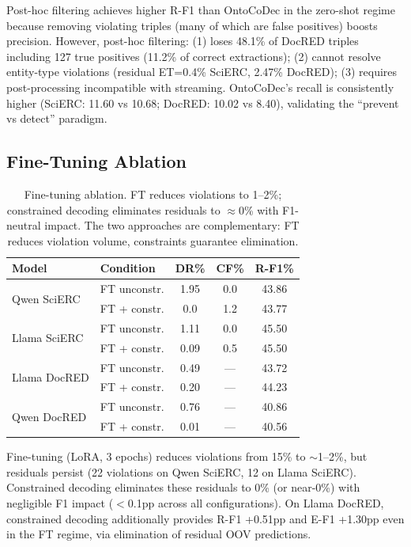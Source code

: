 \documentclass[11pt]{article}
\begin{document}
Post-hoc filtering achieves higher R-F1 than OntoCoDec in the zero-shot regime because removing violating triples (many of which are false positives) boosts precision. However, post-hoc filtering:
(1) loses 48.1\% of DocRED triples including 127 true positives (11.2\% of correct extractions);
(2) cannot resolve entity-type violations (residual ET=0.4\% SciERC, 2.47\% DocRED);
(3) requires post-processing incompatible with streaming.
OntoCoDec's recall is consistently higher (SciERC: 11.60 vs 10.68; DocRED: 10.02 vs 8.40), validating the ``prevent vs detect'' paradigm.

\subsection{Fine-Tuning Ablation}
\label{sec:ft}

\begin{table}[t]
\centering
\small
\begin{tabular}{llccc}
\toprule
\textbf{Model} & \textbf{Condition} & \textbf{DR\%} & \textbf{CF\%} & \textbf{R-F1\%} \\
\midrule
\multirow{2}{*}{Qwen SciERC} & FT unconstr. & 1.95 & 0.0 & 43.86 \\
 & FT + constr. & 0.0 & 1.2 & 43.77 \\
\midrule
\multirow{2}{*}{Llama SciERC} & FT unconstr. & 1.11 & 0.0 & 45.50 \\
 & FT + constr. & 0.09 & 0.5 & 45.50 \\
\midrule
\multirow{2}{*}{Llama DocRED} & FT unconstr. & 0.49 & --- & 43.72 \\
 & FT + constr. & 0.20 & --- & 44.23 \\
\midrule
\multirow{2}{*}{Qwen DocRED} & FT unconstr. & 0.76 & --- & 40.86 \\
 & FT + constr. & 0.01 & --- & 40.56 \\
\bottomrule
\end{tabular}
\caption{Fine-tuning ablation. FT reduces violations to 1--2\%; constrained decoding eliminates residuals to $\approx$0\% with F1-neutral impact. The two approaches are complementary: FT reduces violation volume, constraints guarantee elimination.}
\label{tab:ft}
\end{table}

Fine-tuning (LoRA, 3 epochs) reduces violations from 15\% to $\sim$1--2\%, but residuals persist (22 violations on Qwen SciERC, 12 on Llama SciERC). Constrained decoding eliminates these residuals to 0\% (or near-0\%) with negligible F1 impact ($<$0.1pp across all configurations). On Llama DocRED, constrained decoding additionally provides R-F1 +0.51pp and E-F1 +1.30pp even in the FT regime, via elimination of residual OOV predictions.
\end{document}
